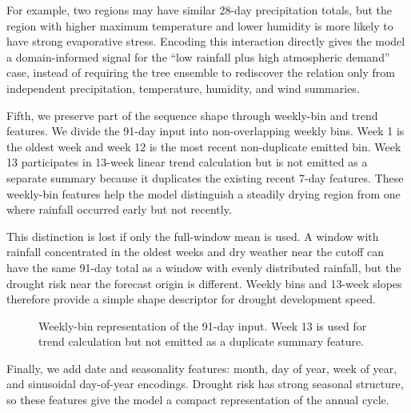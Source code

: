 \documentclass[conference]{IEEEtran}
\begin{document}
For example, two regions may have similar 28-day precipitation totals, but the
region with higher maximum temperature and lower humidity is more likely to have
strong evaporative stress. Encoding this interaction directly gives the model a
domain-informed signal for the ``low rainfall plus high atmospheric demand''
case, instead of requiring the tree ensemble to rediscover the relation only
from independent precipitation, temperature, humidity, and wind summaries.

Fifth, we preserve part of the sequence shape through weekly-bin and trend
features. We divide the 91-day input into non-overlapping weekly bins. Week 1 is
the oldest week and week 12 is the most recent non-duplicate emitted bin. Week
13 participates in 13-week linear trend calculation but is not emitted as a
separate summary because it duplicates the existing recent 7-day features.
These weekly-bin features help the model distinguish a steadily drying region
from one where rainfall occurred early but not recently.

This distinction is lost if only the full-window mean is used. A window with
rainfall concentrated in the oldest weeks and dry weather near the cutoff can
have the same 91-day total as a window with evenly distributed rainfall, but the
drought risk near the forecast origin is different. Weekly bins and 13-week
slopes therefore provide a simple shape descriptor for drought development
speed.

\begin{figure}[t]
\centering
{}
\caption{Weekly-bin representation of the 91-day input. Week 13 is used for
trend calculation but not emitted as a duplicate summary feature.}
\label{fig:weekly_bins}
\end{figure}

Finally, we add date and seasonality features: month, day of year, week of
year, and sinusoidal day-of-year encodings. Drought risk has strong seasonal
structure, so these features give the model a compact representation of the
annual cycle.
\end{document}
